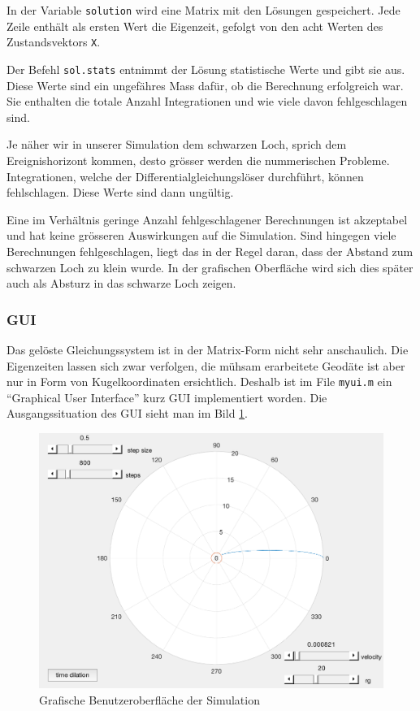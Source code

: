 \begin{refsection}
    In der Variable \texttt{solution} wird eine Matrix mit den Lösungen gespeichert. Jede Zeile enthält als ersten Wert die Eigenzeit, gefolgt von den acht Werten des Zustandsvektors \texttt{X}.
    
    Der Befehl \texttt{sol.stats} entnimmt der Lösung statistische Werte und gibt sie aus. Diese Werte sind ein ungefähres Mass dafür, ob die Berechnung erfolgreich war. Sie enthalten die totale Anzahl Integrationen und wie viele davon fehlgeschlagen sind.
    
    Je näher wir in unserer Simulation dem schwarzen Loch, sprich dem Ereignishorizont kommen, desto grösser werden die nummerischen Probleme. Integrationen, welche der Differentialgleichungslöser durchführt, können fehlschlagen. Diese Werte sind dann ungültig.
    
    Eine im Verhältnis geringe Anzahl fehlgeschlagener Berechnungen ist akzeptabel und hat keine grösseren Auswirkungen auf die Simulation. Sind hingegen viele Berechnungen fehlgeschlagen, liegt das in der Regel daran, dass der Abstand zum schwarzen Loch zu klein wurde. In der grafischen Oberfläche wird sich dies später auch als Absturz in das schwarze Loch zeigen.
    
    \subsubsection{GUI}
    Das gelöste Gleichungssystem ist in der Matrix-Form nicht sehr anschaulich. Die Eigenzeiten lassen sich zwar verfolgen, die mühsam erarbeitete Geodäte ist aber nur in Form von Kugelkoordinaten ersichtlich. Deshalb ist im File \texttt{myui.m} ein ``Graphical User Interface'' kurz GUI implementiert worden. Die Ausgangssituation des GUI sieht man im Bild \ref{skript:zeitreisen:fig:gui}.
    \begin{figure}
        \centering
        \includegraphics[width=12cm]{zeitreisen/gui.png}
        \caption{Grafische Benutzeroberfläche der Simulation}
        \label{skript:zeitreisen:fig:gui} 
    \end{figure}
    

\end{refsection}
